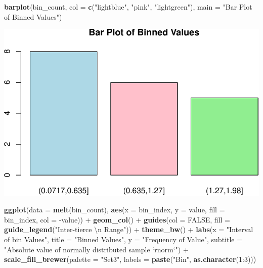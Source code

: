 \documentclass[]{article}
\newenvironment{Shaded}{}{}
\newcommand{\CharTok}[1]{\textcolor[rgb]{0.25,0.44,0.63}{#1}}
\newcommand{\DataTypeTok}[1]{\textcolor[rgb]{0.56,0.13,0.00}{#1}}
\newcommand{\DecValTok}[1]{\textcolor[rgb]{0.25,0.63,0.44}{#1}}
\newcommand{\KeywordTok}[1]{\textcolor[rgb]{0.00,0.44,0.13}{\textbf{#1}}}
\newcommand{\NormalTok}[1]{#1}
\newcommand{\OperatorTok}[1]{\textcolor[rgb]{0.40,0.40,0.40}{#1}}
\newcommand{\OtherTok}[1]{\textcolor[rgb]{0.00,0.44,0.13}{#1}}
\newcommand{\StringTok}[1]{\textcolor[rgb]{0.25,0.44,0.63}{#1}}
\begin{document}
\begin{Shaded}
\begin{Highlighting}[]
\KeywordTok{barplot}\NormalTok{(bin_count, }\DataTypeTok{col =} \KeywordTok{c}\NormalTok{(}\StringTok{"lightblue"}\NormalTok{, }\StringTok{"pink"}\NormalTok{, }\StringTok{"lightgreen"}\NormalTok{), }\DataTypeTok{main =} \StringTok{"Bar Plot of Binned Values"}\NormalTok{)}
\end{Highlighting}
\end{Shaded}

\includegraphics{./figure/unnamed-chunk-7-2.pdf}

\begin{Shaded}
\begin{Highlighting}[]
\KeywordTok{ggplot}\NormalTok{(}\DataTypeTok{data =} \KeywordTok{melt}\NormalTok{(bin_count), }\KeywordTok{aes}\NormalTok{(}\DataTypeTok{x =}\NormalTok{ bin_index, }\DataTypeTok{y =}\NormalTok{ value, }\DataTypeTok{fill =}\NormalTok{ bin_index, }\DataTypeTok{col =} \OperatorTok{-}\NormalTok{value)) }\OperatorTok{+}
\StringTok{  }\KeywordTok{geom_col}\NormalTok{() }\OperatorTok{+}
\StringTok{  }\KeywordTok{guides}\NormalTok{(}\DataTypeTok{col =} \OtherTok{FALSE}\NormalTok{, }\DataTypeTok{fill =} \KeywordTok{guide_legend}\NormalTok{(}\StringTok{"Inter-tierce }\CharTok{\textbackslash{}n}\StringTok{ Range"}\NormalTok{)) }\OperatorTok{+}
\StringTok{  }\KeywordTok{theme_bw}\NormalTok{() }\OperatorTok{+}
\StringTok{  }\KeywordTok{labs}\NormalTok{(}\DataTypeTok{x =} \StringTok{"Interval of bin Values"}\NormalTok{, }\DataTypeTok{title =} \StringTok{"Binned Values"}\NormalTok{, }\DataTypeTok{y =} \StringTok{"Frequency of Value"}\NormalTok{, }
       \DataTypeTok{subtitle =} \StringTok{"Absolute value of normally distributed sample `rnorm`"}\NormalTok{) }\OperatorTok{+}
\StringTok{  }\KeywordTok{scale_fill_brewer}\NormalTok{(}\DataTypeTok{palette =} \StringTok{"Set3"}\NormalTok{, }\DataTypeTok{labels =} \KeywordTok{paste}\NormalTok{(}\StringTok{"Bin"}\NormalTok{, }\KeywordTok{as.character}\NormalTok{(}\DecValTok{1}\OperatorTok{:}\DecValTok{3}\NormalTok{)))}
\end{Highlighting}
\end{Shaded}
\end{document}
